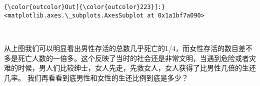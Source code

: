 \documentclass[11pt]{article}
\begin{document}
\begin{Verbatim}[commandchars=\\\{\}]
{\color{outcolor}Out[{\color{outcolor}223}]:} <matplotlib.axes.\_subplots.AxesSubplot at 0x1a1bf7a090>
\end{Verbatim}
            
    \begin{center}
    \end{center}
    { \hspace*{\fill} \\}
    
    从上图我们可以明显看出男性存活的总数几乎死亡的1/4，而女性存活的数目差不多是死亡人数的一倍多。这个反映了当时的社会还是非常文明，当遇到危险或者灾难的时候，男人们比较绅士，女人先走，先救女人，女人获得了比男性几倍的生还几率。
我们再看看到底男性和女性的生还比例到底是多少？
\end{document}
